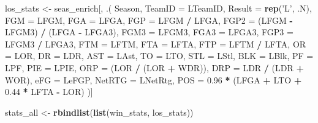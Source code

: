 \documentclass[]{article}
\newenvironment{Shaded}{\begin{snugshade}}{\end{snugshade}}
\newcommand{\KeywordTok}[1]{\textcolor[rgb]{0.13,0.29,0.53}{\textbf{#1}}}
\newcommand{\DataTypeTok}[1]{\textcolor[rgb]{0.13,0.29,0.53}{#1}}
\newcommand{\FloatTok}[1]{\textcolor[rgb]{0.00,0.00,0.81}{#1}}
\newcommand{\StringTok}[1]{\textcolor[rgb]{0.31,0.60,0.02}{#1}}
\newcommand{\OperatorTok}[1]{\textcolor[rgb]{0.81,0.36,0.00}{\textbf{#1}}}
\newcommand{\NormalTok}[1]{#1}
\begin{document}
\begin{Shaded}
\begin{Highlighting}[]
{{{{{{{{{{{\NormalTok{los_stats <-}\StringTok{ }\NormalTok{seas_enrich[, .(}
\NormalTok{  Season,}
  \DataTypeTok{TeamID =}\NormalTok{ LTeamID,}
  \DataTypeTok{Result =} \KeywordTok{rep}\NormalTok{(}\StringTok{'L'}\NormalTok{, .N),}
  \DataTypeTok{FGM =}\NormalTok{ LFGM,}
  \DataTypeTok{FGA =}\NormalTok{ LFGA,}
  \DataTypeTok{FGP =}\NormalTok{ LFGM }\OperatorTok{/}\StringTok{ }\NormalTok{LFGA,}
  \DataTypeTok{FGP2 =}\NormalTok{ (LFGM }\OperatorTok{-}\StringTok{ }\NormalTok{LFGM3) }\OperatorTok{/}\StringTok{ }\NormalTok{(LFGA }\OperatorTok{-}\StringTok{ }\NormalTok{LFGA3),}
  \DataTypeTok{FGM3 =}\NormalTok{ LFGM3,}
  \DataTypeTok{FGA3 =}\NormalTok{ LFGA3,}
  \DataTypeTok{FGP3 =}\NormalTok{ LFGM3 }\OperatorTok{/}\StringTok{ }\NormalTok{LFGA3,}
  \DataTypeTok{FTM =}\NormalTok{ LFTM,}
  \DataTypeTok{FTA =}\NormalTok{ LFTA,}
  \DataTypeTok{FTP =}\NormalTok{ LFTM }\OperatorTok{/}\StringTok{ }\NormalTok{LFTA,}
  \DataTypeTok{OR =}\NormalTok{ LOR,}
  \DataTypeTok{DR =}\NormalTok{ LDR,}
  \DataTypeTok{AST =}\NormalTok{ LAst,}
  \DataTypeTok{TO =}\NormalTok{ LTO,}
  \DataTypeTok{STL =}\NormalTok{ LStl,}
  \DataTypeTok{BLK =}\NormalTok{ LBlk,}
  \DataTypeTok{PF =}\NormalTok{ LPF,}
  \DataTypeTok{PIE =}\NormalTok{ LPIE,}
  \DataTypeTok{ORP =}\NormalTok{ (LOR }\OperatorTok{/}\StringTok{ }\NormalTok{(LOR }\OperatorTok{+}\StringTok{ }\NormalTok{WDR)),}
  \DataTypeTok{DRP =}\NormalTok{ LDR }\OperatorTok{/}\StringTok{ }\NormalTok{(LDR }\OperatorTok{+}\StringTok{ }\NormalTok{WOR),}
  \DataTypeTok{eFG =}\NormalTok{ LeFGP,}
  \DataTypeTok{NetRTG =}\NormalTok{ LNetRtg,}
  \DataTypeTok{POS =} \FloatTok{0.96} \OperatorTok{*}\StringTok{ }\NormalTok{(LFGA }\OperatorTok{+}\StringTok{ }\NormalTok{LTO }\OperatorTok{+}\StringTok{ }\FloatTok{0.44} \OperatorTok{*}\StringTok{ }\NormalTok{LFTA }\OperatorTok{-}\StringTok{ }\NormalTok{LOR)}
\NormalTok{)]}

\NormalTok{stats_all <-}\StringTok{ }\KeywordTok{rbindlist}\NormalTok{(}\KeywordTok{list}\NormalTok{(win_stats, los_stats))}


}}}}}}}}}}}
\end{Highlighting}
\end{Shaded}
\end{document}
